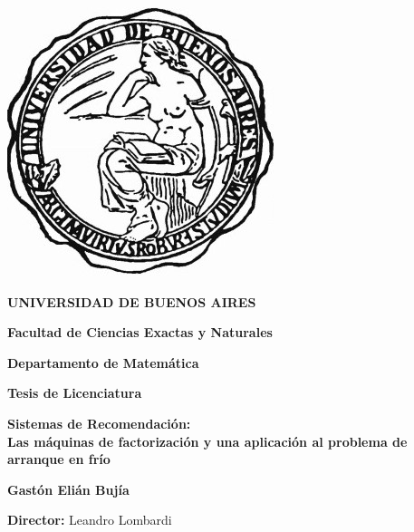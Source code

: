 \thispagestyle{empty}

\begin{titlepage}
\begin {center}

\includegraphics[scale=.3]{uba2.jpg}

\medskip
\textbf{UNIVERSIDAD DE BUENOS AIRES}

\smallskip

\textbf{Facultad de Ciencias Exactas y Naturales}

\smallskip

\textbf{Departamento de Matemática}

\vspace{3.5cm}

\textbf{\large Tesis de Licenciatura}

\vspace{1.5cm}
\textbf{\large Sistemas de Recomendación: \\
Las máquinas de factorización y una aplicación al problema de arranque en frío}
\vspace{1.5cm}

\textbf{Gastón Elián Bujía}

\end {center}

\vspace{1.5cm}

\noindent \textbf{Director:} Leandro Lombardi

\vspace{3cm}


\end{titlepage}